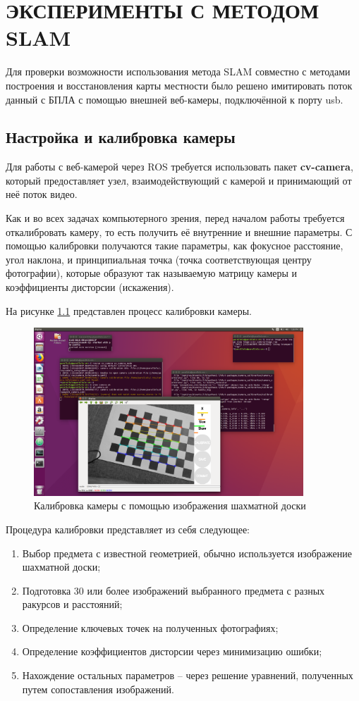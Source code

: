 \chapter{ЭКСПЕРИМЕНТЫ С МЕТОДОМ SLAM}

Для проверки возможности использования метода SLAM совместно с методами построения и восстановления карты местности было решено имитировать поток данный с БПЛА с помощью внешней веб-камеры, подключённой к порту usb.

\section{Настройка и калибровка камеры}

Для работы с веб-камерой через ROS требуется использовать пакет \textbf{cv-camera}, который предоставляет узел, взаимодействующий с камерой и принимающий от неё поток видео.

Как и во всех задачах компьютерного зрения, перед началом работы требуется откалибровать камеру, то есть получить её внутренние и внешние параметры. С помощью калибровки получаются такие параметры, как фокусное расстояние, угол наклона, и принципиальная точка (точка соответствующая центру фотографии), которые образуют так называемую матрицу камеры и коэффициенты дисторсии (искажения). 

На рисунке \ref{fig:chess} представлен процесс калибровки камеры. 

\begin{figure}[h]
    \centering
    \includegraphics[width=0.9\textwidth]{images/chess.png}
    \caption{Калибровка камеры с помощью изображения шахматной доски}
    \label{fig:chess}
\end{figure}

Процедура калибровки представляет из себя следующее:
\begin{enumerate}
    \item Выбор предмета с известной геометрией, обычно используется изображение шахматной доски;
    \item Подготовка 30 или более изображений выбранного предмета с разных ракурсов и расстояний;
    \item Определение ключевых точек на полученных фотографиях;
    \item Определение коэффициентов дисторсии через минимизацию ошибки;
    \item Нахождение остальных параметров -- через решение уравнений, полученных путем сопоставления изображений.
\end{enumerate}


